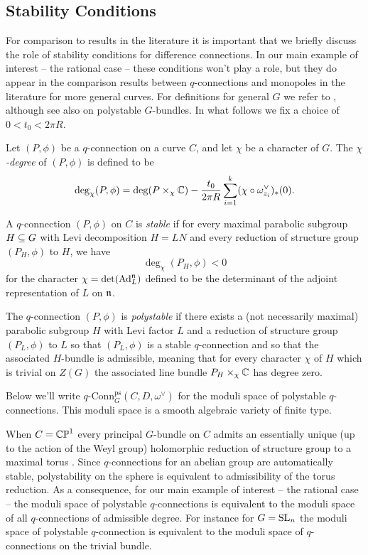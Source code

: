 \documentclass[10pt, oneside]{article}
\newcommand{\qconn}{q\text{-Conn}}
\begin{document}
\subsection{Stability Conditions}
For comparison to results in the literature it is important that we briefly discuss the role of stability conditions for difference connections.  In our main example of interest -- the rational case -- these conditions won't play a role, but they do appear in the comparison results between $q$-connections and monopoles in the literature for more general curves.  For definitions for general $G$ we refer to \cite{Smith}, although see also \cite{AnchoucheBiswas} on polystable $G$-bundles.  In what follows we fix a choice of $0 < t_0 < 2\pi R$.

\begin{definition}
Let $(P,\phi)$ be a $q$-connection on a curve $C$, and let $\chi$ be a character of $G$.  The \emph{$\chi$-degree} of $(P,\phi)$ is defined to be 
\[\deg_\chi(P,\phi) = \deg(P \times_\chi \mathbb{C}) - \frac {t_0}{2\pi R} \sum_{i=1}^k (\chi \circ \omega^\vee_{z_i})_*(0).\]


A $q$-connection $(P,\phi)$ on $C$ is \emph{stable} if for every maximal parabolic subgroup $H \subseteq G$ with Levi decomposition $H = LN$ and every reduction of structure group $(P_H, \phi)$ to $H$, we have
\[\deg_\chi(P_H, \phi) < 0\]
for the character $\chi = \det(\mathrm{Ad}_L^{\mathfrak{n}})$ defined to be the determinant of the adjoint representation of $L$ on $\mathfrak{n}$.

The $q$-connection $(P,\phi)$ is \emph{polystable} if there exists a (not necessarily maximal) parabolic subgroup $H$ with Levi factor $L$ and a reduction of structure group $(P_L, \phi)$ to $L$ so that $(P_L,\phi)$ is a stable $q$-connection and so that the associated $H$-bundle is admissible, meaning that for every character $\chi$ of $H$ which is trivial on $Z(G)$ the associated line bundle $P_H \times_\chi \mathbb{C}$ has degree zero. 
\end{definition}

Below we'll write $\qconn_G^{\text{ps}}(C, D, \omega^\vee)$ for the moduli space of polystable $q$-connections.  This moduli space is a smooth algebraic variety of finite type.  

When $C = \mathbb{CP}^1$ every principal $G$-bundle on $C$ admits an essentially unique (up to the action of the Weyl group) holomorphic reduction of structure group to a maximal torus \cite{GrothendieckSphere}.  Since $q$-connections for an abelian group are automatically stable, polystability on the sphere is equivalent to admissibility of the torus reduction.  As a consequence, for our main example of interest -- the rational case -- the moduli space of polystable $q$-connections is equivalent to the moduli space of all $q$-connections of admissible degree.  For instance for $G=\mathrm{SL}_n$ the moduli space of polystable $q$-connection is equivalent to the moduli space of $q$-connections on the trivial bundle.
\end{document}
